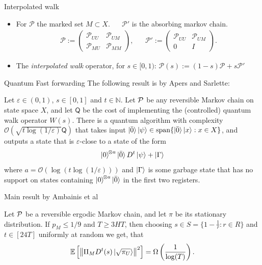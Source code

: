 \documentclass[10pt]{beamer}
\newcommand{\eps}{\varepsilon}
\newcommand{\nrm}[1]{\left\lVert #1 \right\rVert}
\newcommand{\bigO}[1]{\mathcal{O}\left( #1 \right)}
\newcommand{\PM}{\mathcal{P}}
\newcommand{\barO}{\bar{0}}
\begin{document}
\begin{frame}{Interpolated walk}
\begin{itemize}
    \item For $\PM$ the marked set $M\subset X$. ~~ $\PM'$ is the absorbing markov chain.
        \begin{align*}
    \PM :=\left(\begin{array}{cc} \PM_{UU} & \PM_{UM} \\ \PM_{MU} & \PM_{MM} \end{array}\right), & &
    \PM' :=\left(\begin{array}{cc} \PM_{UU} & \PM_{UM} \\ 0 & I \end{array}\right).
    \end{align*}
    \item The \emph{interpolated walk} operator, for $s\in [0,1)$:
$\PM(s):=(1 - s)\PM + s\PM'$
\end{itemize}
\end{frame}

\begin{frame}{Quantum Fast forwarding}
The following result is by Apers and Sarlette:
    \begin{theorem}\label{thm:fast-forwarding}
Let $\eps\in(0,1)$, $s\in[0,1]$ and $t\in\mathbb{N}$. Let $\cal P$ be any reversible Markov chain on state space $X$, and let $\mathsf{Q}$ be the cost of implementing the (controlled) quantum walk operator $W(s)$. There is a quantum algorithm with complexity $\bigO{\sqrt{t\log(1/\eps)}\mathsf{Q}}$ that takes input $\ket{\barO}\ket{\psi}\in \mathrm{span}\{\ket{\barO}\ket{x}:x\in X\}$, and outputs a state that is $\eps$-close to a state of the form
$$\ket{0}^{\!\otimes a}\ket{\barO}D^t\ket{\psi}+\ket{\Gamma}$$
where $a=\bigO{\log(t\log(1/\eps))}$ and $\ket{\Gamma}$ is some garbage state that has no support on states containing $\ket{0}^{\!\otimes a}\ket{\barO}$ in the first two registers.%
\end{theorem}
\end{frame}

\begin{frame}{Main result by Ambainis et al}
    \begin{theorem}
	Let $\cal P$ be a reversible ergodic Markov chain, and let $\pi$ be its stationary distribution.
	If $p_M\leq 1/9$ and $T\geq 3HT$, then choosing $s\in S=\{1-\frac{1}{r}:r\in R\}$ and $t\in [24T]$ uniformly at random we get, that 
	$$\mathbb{E}\left[\nrm{\Pi_M D^t(s)\ket{\sqrt{\pi_U}}}^2\right]= \Omega\left(\frac{1}{\log(T)}\right).$$
\end{theorem}\label{cor:AMRMS}
\end{frame}
\end{document}
